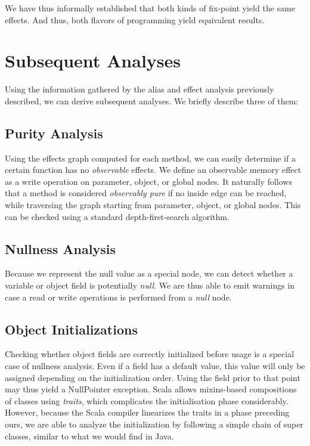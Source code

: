We have thus informally established that both kinds of fix-point yield the
same effects. And thus, both flavors of programming yield equivalent
results.

\section{Subsequent Analyses}
Using the information gathered by the alias and effect analysis previously
described, we can derive subsequent analyses. We briefly describe three of
them:

\subsection{Purity Analysis}
Using the effects graph computed for each method, we can easily determine if a
certain function has no \emph{observable} effects. We define an observable
memory effect as a write operation on parameter, object, or global nodes. It
naturally follows that a method is considered \emph{observably pure} if no
inside edge can be reached, while traversing the graph starting from parameter,
object, or global nodes. This can be checked using a standard
depth-first-search algorithm.

\subsection{Nullness Analysis}
Because we represent the null value as a special node, we can detect whether a
variable or object field is potentially \emph{null}. We are thus able to emit
warnings in case a read or write operations is performed from a \emph{null}
node.

\subsection{Object Initializations}
Checking whether object fields are correctly initialized before usage is a
special case of nullness analysis. Even if a field has a default value,
this value will only be assigned depending on the initialization order. Using
the field prior to that point may thus yield a NullPointer exception. Scala
allows mixins-based compositions of classes using \emph{traits}, which
complicates the initialisation phase considerably. However, because the Scala
compiler linearizes the traits in a phase preceding ours, we are able to
analyze the initialization by following a simple chain of super classes,
similar to what we would find in Java.

